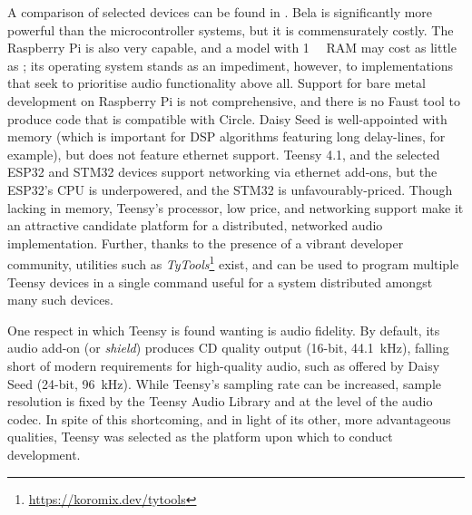 A comparison of selected devices can be found in
.
Bela is significantly more powerful than the microcontroller systems, but it is
commensurately costly.
The Raspberry Pi is also very capable, and a model with \qty{1}{\giga\byte} RAM
may cost as little as ;
its operating system stands as an impediment, however, to implementations that
seek to prioritise audio functionality above all.
Support for bare metal development on Raspberry Pi is not comprehensive, and
there is no Faust tool to produce code that is compatible with Circle.
Daisy Seed is well-appointed with memory (which is important for DSP algorithms
featuring long delay-lines, for example), but does not feature ethernet support.
Teensy 4.1, and the selected ESP32 and STM32 devices support networking via
ethernet add-ons, but the ESP32's CPU is underpowered, and the STM32 is
unfavourably-priced.
Though lacking in memory, Teensy's processor, low price, and networking support
make it an attractive candidate platform for a distributed, networked audio
implementation.
Further, thanks to the presence of a vibrant developer community, utilities such
as \textit{TyTools}\footnote{\url{https://koromix.dev/tytools}} exist, and can
be used to program multiple Teensy devices in a single command \textemdash{}
useful for a system distributed amongst many such devices.

One respect in which Teensy is found wanting is audio fidelity.
By default, its audio add-on (or \textit{shield}) produces CD quality output
(16-bit, \qty{44.1}{\kHz}), falling short of modern requirements for
high-quality audio, such as offered by Daisy Seed (24-bit, \qty{96}{\kHz}).
While Teensy's sampling rate can be increased, sample resolution is fixed by
the Teensy Audio Library and at the level of the audio codec.
In spite of this shortcoming, and in light of its other, more advantageous
qualities, Teensy was selected as the platform upon which to conduct
development.
